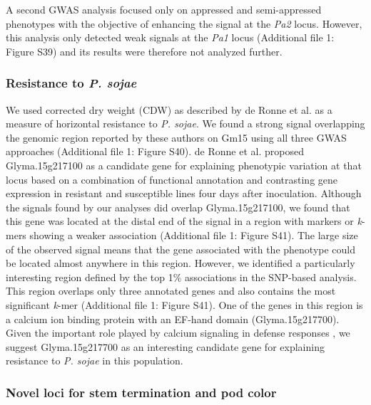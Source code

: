 \documentclass[doublespacing]{bmcart}
\begin{document}
A second GWAS analysis focused only on appressed and semi-appressed phenotypes
with the objective of enhancing the signal at the \emph{Pa2} locus. However,
this analysis only detected weak signals at the \emph{Pa1} locus (Additional file 1: Figure
S39) and its results were therefore not
analyzed further.

\subsubsection*{Resistance to \textit{P. sojae}}

We used corrected dry weight (CDW) as described by de Ronne et al. \cite{deronne2022} as a
measure of horizontal resistance to \emph{P. sojae}. We found a strong signal
overlapping the genomic region reported by these authors on Gm15 using all three GWAS
approaches (Additional file 1: Figure S40). de Ronne et al. \cite{deronne2022}
proposed Glyma.15g217100 as a candidate gene for explaining phenotypic
variation at that locus based on a combination of functional annotation and
contrasting gene expression in resistant and susceptible lines four days after
inoculation. Although the signals found by our analyses did overlap
Glyma.15g217100, we found that this gene was located at the distal end of the signal
in a region with markers or \emph{k}-mers showing a weaker
association (Additional file 1: Figure S41). The
large size of the observed signal means that the gene associated with the phenotype could
be located almost anywhere in this region. However, we identified a particularly
interesting region defined by the top 1\% associations in the SNP-based
analysis. This region overlaps only three annotated genes and also contains the
most significant \emph{k}-mer (Additional file 1: Figure
S41). One of the genes in this region is
a calcium ion binding protein with an EF-hand domain (Glyma.15g217700).
Given the important role played by calcium signaling in defense
responses \citep{zhang2014}, we suggest Glyma.15g217700 as an interesting
candidate gene for explaining resistance to \emph{P. sojae} in this population.

\subsubsection*{Novel loci for stem termination and pod color}
\end{document}
